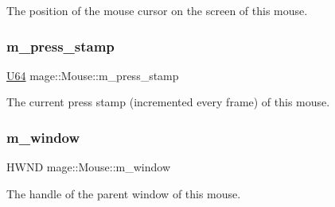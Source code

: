 The position of the mouse cursor on the screen of this mouse. \hypertarget{classmage_1_1_mouse_a7633df92a818760b3efe694d4688961c}{}\label{classmage_1_1_mouse_a7633df92a818760b3efe694d4688961c} 
\subsubsection{\texorpdfstring{m\+\_\+press\+\_\+stamp}{m\_press\_stamp}}
{\footnotesize\ttfamily \hyperlink{namespacemage_a6672cf3c861707ce4a3235a3eb43941d}{U64} mage\+::\+Mouse\+::m\+\_\+press\+\_\+stamp\hspace{0.3cm}{\ttfamily [private]}}

The current press stamp (incremented every frame) of this mouse. \hypertarget{classmage_1_1_mouse_ac4cb2f70b32a99c7acace534df46d35c}{}\label{classmage_1_1_mouse_ac4cb2f70b32a99c7acace534df46d35c} 
\subsubsection{\texorpdfstring{m\+\_\+window}{m\_window}}
{\footnotesize\ttfamily H\+W\+ND mage\+::\+Mouse\+::m\+\_\+window\hspace{0.3cm}{\ttfamily [private]}}

The handle of the parent window of this mouse. 